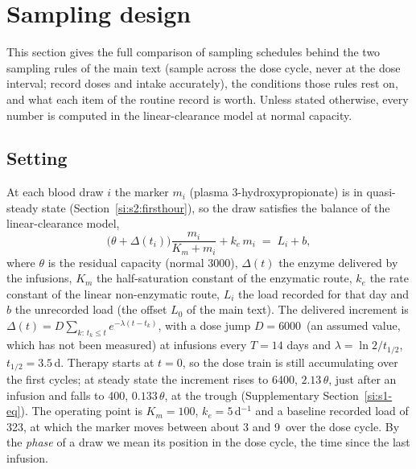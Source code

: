 \section{Sampling design}
\label{si:s2}

This section gives the full comparison of sampling schedules behind the two sampling rules of
the main text (sample across the dose cycle, never at the dose interval; record doses and intake
accurately), the conditions those rules rest on, and what each item of the routine record is
worth. Unless stated otherwise, every number is computed in the linear-clearance model at normal
capacity.

\subsection{Setting}
\label{si:s2:setting}

At each blood draw $i$ the marker $m_i$ (plasma 3-hydroxypropionate) is in quasi-steady state
(Section~\ref{si:s2:firsthour}), so the draw satisfies the balance of the linear-clearance model,
\begin{equation}
\label{seq:qss}
\bigl(\theta+\Delta(t_i)\bigr)\frac{m_i}{K_m+m_i}+k_e\,m_i \;=\; L_i+b ,
\end{equation}
where $\theta$ is the residual capacity (normal 3000\um), $\Delta(t)$ the enzyme delivered by the
infusions, $K_m$ the half-saturation constant of the enzymatic route, $k_e$ the rate constant of
the linear non-enzymatic route, $L_i$ the load recorded for that day and $b$ the unrecorded load
(the offset $L_0$ of the main text). The delivered increment is
$\Delta(t)=D\sum_{k:\,t_k\le t}e^{-\lambda(t-t_k)}$, with a dose jump $D=6000$\um\ (an assumed
value, which has not been measured) at infusions every $T=14$ days and $\lambda=\ln2/t_{1/2}$, $t_{1/2}=3.5$\,d. Therapy
starts at $t=0$, so the dose train is still accumulating over the first cycles; at steady state
the increment rises to 6400\um, $2.13\,\theta$, just after an infusion and falls to 400\um,
$0.133\,\theta$, at the trough (Supplementary Section~\ref{si:s1-eq}). The operating point is $K_m=100$\uM, $k_e=5$\,d$^{-1}$ and a baseline recorded load of
323\um, at which the marker moves between about 3 and 9\uM\ over the dose cycle. By the
\emph{phase} of a draw we mean its position in the dose cycle, the time since the last infusion.


